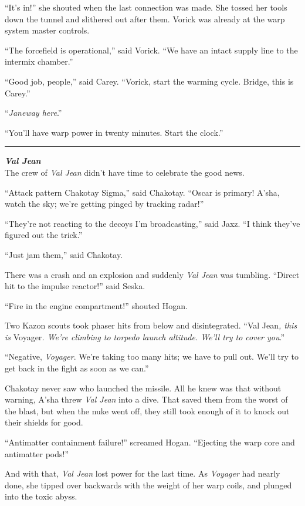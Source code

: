 \documentclass[twoside,letterpaper,12pt]{memoir}
\begin{document}
``It's in!'' she shouted when the last connection was made. She tossed her tools down the tunnel and slithered out after them. Vorick was already at the warp system master controls.

``The forcefield is operational,'' said Vorick. ``We have an intact supply line to the intermix chamber.''

``Good job, people,'' said Carey. ``Vorick, start the warming cycle. Bridge, this is Carey.''

``\textit{Janeway here}.''

``You'll have warp power in twenty minutes. Start the clock.''

\fancybreak{\rule{3cm}{0.4 pt}}
\noindent\textit{\textbf{Val Jean}}\\

The crew of \textit{Val Jean} didn't have time to celebrate the good news.

``Attack pattern Chakotay Sigma,'' said Chakotay. ``Oscar is primary! A'sha, watch the sky; we're getting pinged by tracking radar!''

``They're not reacting to the decoys I'm broadcasting,'' said Jaxz. ``I think they've figured out the trick.''

``Just jam them,'' said Chakotay.

There was a crash and an explosion and suddenly \textit{Val Jean} was tumbling. ``Direct hit to the impulse reactor!'' said Seska.

``Fire in the engine compartment!'' shouted Hogan.

Two Kazon scouts took phaser hits from below and disintegrated. ``Val Jean\textit{, this is }Voyager\textit{. We're climbing to torpedo launch altitude. We'll try to cover you}.''

``Negative, \textit{Voyager}. We're taking too many hits; we have to pull out. We'll try to get back in the fight as soon as we can.''

Chakotay never saw who launched the missile. All he knew was that without warning, A'sha threw \textit{Val Jean} into a dive. That saved them from the worst of the blast, but when the nuke went off, they still took enough of it to knock out their shields for good.

``Antimatter containment failure!'' screamed Hogan. ``Ejecting the warp core and antimatter pods!''

And with that, \textit{Val Jean} lost power for the last time. As \textit{Voyager} had nearly done, she tipped over backwards with the weight of her warp coils, and plunged into the toxic abyss.
\end{document}
